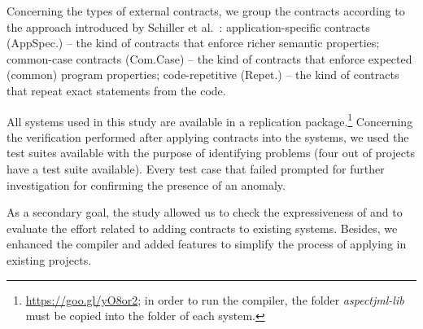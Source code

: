 Concerning the types of external contracts, we group the contracts according to
the approach introduced by Schiller et al.~\cite{typeContracts}: application-specific contracts
(AppSpec.) -- the kind of contracts that enforce richer semantic properties;
 common-case contracts (Com.Case) -- the kind of contracts that enforce
expected (common) program properties;
code-repetitive (Repet.) -- the kind of
contracts that repeat exact statements from the code.

All systems used in this study are available in a replication
package.\footnote{\url{https://goo.gl/yO8or2}; in order to run the
\contractjdoc{} compiler, the folder \textit{aspectjml-lib} must be copied into the folder of each system.}
Concerning the verification performed after applying \contractjdoc{} contracts into the systems,
we used the test suites available with the purpose of identifying problems
(four out of \totalSystems{} projects have a test suite available).
Every test case that failed prompted for further investigation for confirming the presence of an anomaly.

As a secondary goal, the study allowed us to check the expressiveness of \contractjdoc{} and to
evaluate the effort related to adding contracts to existing systems.
Besides, we enhanced the compiler and added features to simplify
the process of applying \contractjdoc{} in existing projects.

